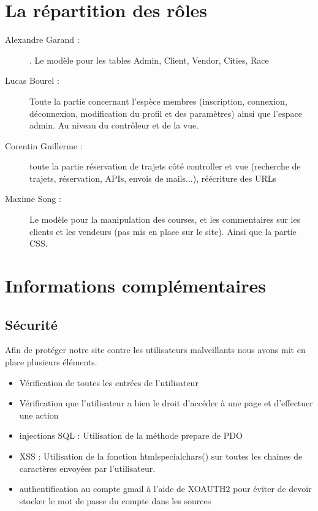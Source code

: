 \documentclass{article}
\begin{document}
\section{La répartition des rôles}
\begin{description}
 \item[Alexandre Garand :]. Le modèle pour les tables Admin, Client, Vendor, Cities, Race 
 \\
 
 
 \item[Lucas Bourel :] Toute la partie concernant l'espèce membres (inscription, connexion, déconnexion, modification du profil et des paramètres) ainsi que l'espace admin. Au niveau du contrôleur et de la vue. 
 \\
 
 \item[Corentin Guillerme :] toute la partie réservation de trajets côté controller et vue (recherche de trajets, réservation, APIs, envois de mails...), réécriture des URLs
 \\
 
 \item[Maxime Song :] Le modèle pour la manipulation des courses, et les commentaires sur les clients et les vendeurs (pas mis en place sur le site). Ainsi que la partie CSS. 
 \\
\end{description}

\section{Informations complémentaires}
    \subsection{Sécurité}
        Afin de protéger notre site contre les utilisateurs malveillants nous avons mit en place plusieurs éléments.
        \\
        
        \begin{itemize}
        \item Vérification de toutes les entrées de l'utilisateur
        \\
        
        \item Vérification que l'utilisateur a bien le droit d'accéder à une page et d'effectuer une action
        \\
        
        \item injections SQL : Utilisation de la méthode prepare de PDO 
        \\
        
        \item XSS : Utilisation de la fonction htmlspecialchars() sur toutes les chaines de caractères envoyées par l'utilisateur.
        \\
        
        \item authentification au compte gmail à l'aide de XOAUTH2 pour éviter de devoir stocker le mot de passe du compte dans les sources
        
        \end{itemize}
\end{document}
